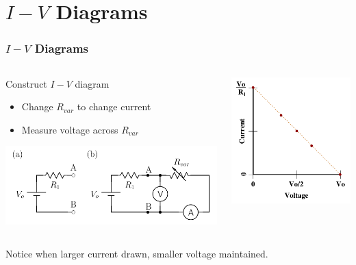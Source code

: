 \documentclass[beamer]{standalone}
\begin{document}
\section{$I-V$ Diagrams}
\begin{frame}
 \frametitle{$I-V$ Diagrams}
 \begin{columns}[T]
  \begin{column}{0.6\textwidth}
   \begin{block}{Construct $I-V$ diagram}
    \begin{itemize}
     \item Change $R_{var}$ to change current
     \item Measure voltage across $R_{var}$
    \end{itemize}
   \end{block}
   \includegraphics[width=\textwidth]{./pics/IV_circuit}
  \end{column}
  \begin{column}{0.4\textwidth}
   \includegraphics[width=\textwidth]{./pics/IV_Thevenin}
  \end{column}
 \end{columns}
 Notice when larger current drawn, smaller voltage maintained.
\end{frame}
\end{document}
